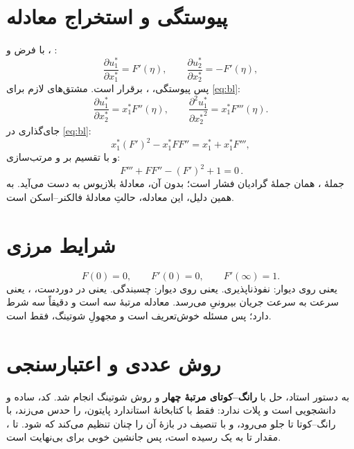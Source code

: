 \documentclass[12pt,a4paper]{article}
\begin{document}
\section{پیوستگی و استخراج معادله}
با فرض  و ،
:
\begin{equation}
\frac{\partial u_1^*}{\partial x_1^*} = F'(\eta),
\qquad
\frac{\partial u_2^*}{\partial x_2^*} = -F'(\eta),
\end{equation}
پس پیوستگی، ، برقرار است. مشتق‌های لازم برای
\eqref{eq:bl}:
\begin{equation}
\frac{\partial u_1^*}{\partial x_2^*} = x_1^*F''(\eta),
\qquad
\frac{\partial^2 u_1^*}{\partial {x_2^*}^2} = x_1^*F'''(\eta).
\end{equation}
جای‌گذاری در \eqref{eq:bl}:
\begin{equation}
x_1^*(F')^2 - x_1^*FF'' = x_1^* + x_1^*F''',
\end{equation}
و با تقسیم بر  و مرتب‌سازی:
\begin{equation}
\boxed{\,F''' + FF'' - (F')^2 + 1 = 0\,}.
\end{equation}
جملهٔ ، همان جملهٔ گرادیان فشار است؛ بدون آن، معادلهٔ بلازیوس
به دست می‌آید. به همین دلیل، این معادله، حالتِ  معادلهٔ
فالکنر--اسکن است.

\section{شرایط مرزی}
\begin{equation}
F(0)=0, \qquad F'(0)=0, \qquad F'(\infty)=1.
\end{equation}
 یعنی  روی دیوار: نفوذناپذیری.
 یعنی  روی دیوار: چسبندگی.
 یعنی در دوردست، ، یعنی سرعت
به سرعت جریان بیرونیِ  می‌رسد. معادله مرتبهٔ سه است و
دقیقاً سه شرط دارد؛ پس مسئله خوش‌تعریف است و مجهولِ شوتینگ، فقط
 است.

\section{روش عددی و اعتبارسنجی}
به دستور استاد، حل با \textbf{رانگ--کوتای مرتبهٔ چهار} و روش شوتینگ
انجام شد. کد، ساده و دانشجویی است و پلات ندارد: فقط با کتابخانهٔ
استاندارد پایتون،  را حدس می‌زند، با رانگ--کوتا تا
 جلو می‌رود، و با تنصیف در بازهٔ \lr{$[1.0,1.5]$} آن را
چنان تنظیم می‌کند که  شود. تا ، مقدار
 تا  به یک رسیده است، پس  جانشین
خوبی برای بی‌نهایت است.
\end{document}
